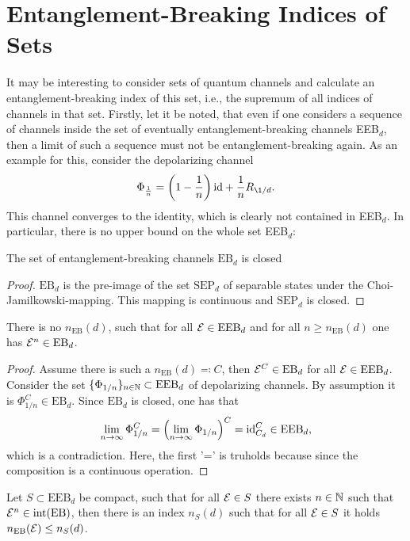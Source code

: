 \section{Entanglement-Breaking Indices of Sets}\label{ch:result-sets}
It may be interesting to consider sets of quantum channels and calculate an entanglement-breaking index of this set, i.e., the supremum of all indices of channels in that set. Firstly, let it be noted, that even if one considers a sequence of channels inside the set of eventually entanglement-breaking channels EEB$_d$, then a limit of such a sequence must not be entanglement-breaking again. As an example for this, consider the depolarizing channel
\begin{align}
    \Phi_{\frac{1}{n}}= \left(1-\frac{1}{n}\right)\id + \frac{1}{n}R_{\1/d}.
\end{align}
This channel converges to the identity, which is clearly not contained in EEB$_d$. In particular, there is no upper bound on the whole set EEB$_d$:
\begin{lemma}
    The set of entanglement-breaking channels $\text{EB}_d$ is closed
\end{lemma}
\begin{proof}
    $\text{EB}_d$ is the pre-image of the set $\text{SEP}_d$ of separable states under the Choi-Jamilkowski-mapping. This mapping is continuous and $\text{SEP}_d$ is closed.
\end{proof}
\begin{prop}
    There is no $n_\text{EB}(d)$, such that for all $\mathcal E \in \text{EEB}_d$ and for all $n\geq n_\text{EB}(d)$ one has $\mathcal E^n \in \text{EB}_d$.
\end{prop}
\begin{proof}
    Assume there is such a $n_\text{EB}(d)\eqqcolon C$, then $\mathcal E^C \in \text{EB}_d$ for all $ \mathcal E \in \text{EEB}_d$. Consider the set $\{\Phi_{1/n}\}_{n\in \mathbb{N}} \subset \text{EEB}_d$ of depolarizing channels. By assumption it is $\Phi_{1/n}^C \in \text{EB}_d$. Since $\text{EB}_d$ is closed, one has that
    \begin{align*}
        \lim_{n\rightarrow \infty} \Phi_{1/n}^C = \left( \lim_{n\rightarrow \infty} \Phi_{1/n}\right)^C  = \mathrm{id}_{C_d}^C\in \text{EEB}_d,
    \end{align*}
    which is a contradiction. Here, the first '=' is truholds because since the composition is a continuous operation.
\end{proof}
\begin{prop}
    Let $S \subset \text{EEB}_d$ be compact, such that for all $\mathcal E \in S$ there exists $n \in \mathbb{N}$ such that $\mathcal E^n \in \mathrm{int}(\text{EB})$, then there is an index $n_S(d)$ such that for all $\mathcal E \in S$ it holds $n_\text{EB}(\mathcal E)\leq n_S(d)$.\label{prop:set-index}
\end{prop}

